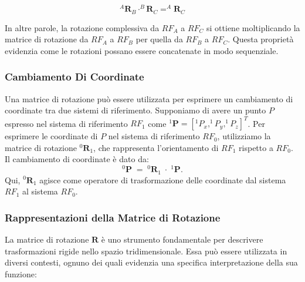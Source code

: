 ﻿\documentclass[11pt, a4paper]{article}
\begin{document}
\[
^{A}\mathbf{R}_{B} \cdot ^{B}\mathbf{R}_{C} = ^{A}\mathbf{R}_{C}
\]

In altre parole, la rotazione complessiva da \( RF_{A} \) a \( RF_{C} \) si ottiene moltiplicando la matrice di rotazione da \( RF_{A} \) a \( RF_{B} \) per quella da \( RF_{B} \) a \( RF_{C} \). Questa proprietà evidenzia come le rotazioni possano essere concatenate in modo sequenziale.
\newpage
\subsubsection{Cambiamento Di Coordinate}
Una matrice di rotazione può essere utilizzata per esprimere un cambiamento di coordinate tra due sistemi di riferimento. Supponiamo di avere un punto $ P $ espresso nel sistema di riferimento $ RF_{1} $ come $ ^1\mathbf{P} = [^1P_x, ^1P_y, ^1P_z]^T $. Per esprimere le coordinate di $ P $ nel sistema di riferimento $ RF_{0} $, utilizziamo la matrice di rotazione $ ^{0}\mathbf{R}_{1} $, che rappresenta l'orientamento di $ RF_{1} $ rispetto a $ RF_{0} $. Il cambiamento di coordinate è dato da:
\[
    ^0\mathbf{P} \; = \; ^{0}\mathbf{R}_{1} \; \cdot \;^{1}\mathbf{P}.
\]
Qui, $ ^{0}\mathbf{R}_{1} $ agisce come operatore di trasformazione delle coordinate dal sistema $ RF_{1} $ al sistema $ RF_{0} $.

\subsubsection{Rappresentazioni della Matrice di Rotazione}

La matrice di rotazione $\mathbf{R}$ è uno strumento fondamentale per descrivere trasformazioni rigide nello spazio tridimensionale. Essa può essere utilizzata in diversi contesti, ognuno dei quali evidenzia una specifica interpretazione della sua funzione:
\end{document}
